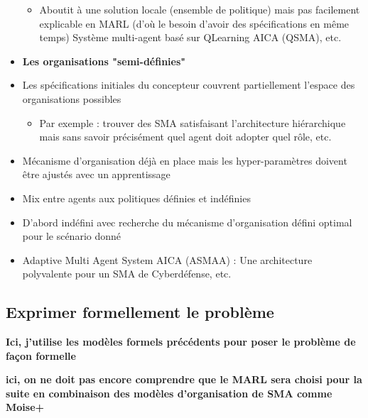 \begin{itemize}
\begin{itemize}
              \item Aboutit à une solution locale (ensemble de politique) mais pas facilement explicable en MARL (d'où le besoin d'avoir des spécifications en même temps)
                    Système multi-agent basé sur QLearning AICA (QSMA), etc.
          \end{itemize}
    \item \textbf{Les organisations "semi-définies"}
    \item Les spécifications initiales du concepteur couvrent partiellement l'espace des organisations possibles
          \begin{itemize}
              \item Par exemple : trouver des SMA satisfaisant l'architecture hiérarchique mais sans savoir précisément quel agent doit adopter quel rôle, etc.
          \end{itemize}
    \item Mécanisme d'organisation déjà en place mais les hyper-paramètres doivent être ajustés avec un apprentissage
    \item Mix entre agents aux politiques définies et indéfinies
    \item D'abord indéfini avec recherche du mécanisme d'organisation défini optimal pour le scénario donné
    \item Adaptive Multi Agent System AICA (ASMAA) : Une architecture polyvalente pour un SMA de Cyberdéfense, etc.
\end{itemize}

\subsection{Exprimer formellement le problème}
\textbf{Ici, j'utilise les modèles formels précédents pour poser le problème de façon formelle}

\textbf{ici, on ne doit pas encore comprendre que le MARL sera choisi pour la suite en combinaison des modèles d'organisation de SMA comme Moise+}

